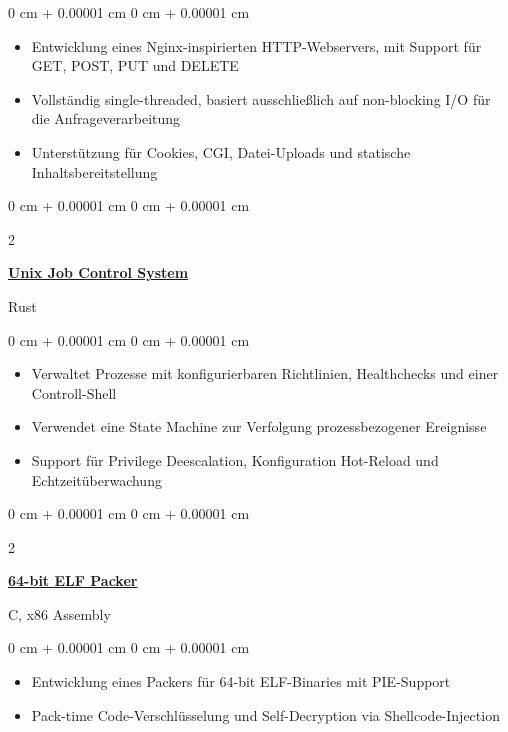 \documentclass[10pt, letterpaper]{article}
\newenvironment{highlights}{
    \begin{itemize}[
        topsep=0.10 cm,
        parsep=0.10 cm,
        partopsep=0pt,
        itemsep=0pt,
        leftmargin=0 cm + 10pt
    ]
}{
    \end{itemize}
}
\newenvironment{onecolentry}{
    \begin{adjustwidth}{
        0 cm + 0.00001 cm
    }{
        0 cm + 0.00001 cm
    }
}{
    \end{adjustwidth}
}
\newenvironment{twocolentry}[2][]{
    \onecolentry
    \def\secondColumn{#2}
    \setcolumnwidth{\fill, 4.5 cm}
    \begin{paracol}{2}
}{
    \switchcolumn \raggedleft \secondColumn
    \end{paracol}
    \endonecolentry
}
\begin{document}
    \vspace{0.10 cm}
    
    \begin{onecolentry}
        \begin{highlights}
            \item Entwicklung eines Nginx-inspirierten HTTP-Webservers, mit Support für GET, POST, PUT und DELETE
            \item Vollständig single-threaded, basiert ausschließlich auf non-blocking I/O für die Anfrageverarbeitung
            \item Unterstützung für Cookies, CGI, Datei-Uploads und statische Inhaltsbereitstellung
        \end{highlights}
    \end{onecolentry}

    \vspace{0.2 cm}

    \begin{twocolentry}
        {Rust}
        \href{https://github.com/winstonallo/taskmaster}{\textbf{Unix Job Control System}}
    \end{twocolentry}

    \vspace{0.10 cm}
    
    \begin{onecolentry}
        \begin{highlights}
            \item Verwaltet Prozesse mit konfigurierbaren Richtlinien, Healthchecks und einer Controll-Shell
            \item Verwendet eine State Machine zur Verfolgung prozessbezogener Ereignisse
            \item Support für Privilege Deescalation, Konfiguration Hot-Reload und Echtzeitüberwachung
        \end{highlights}
    \end{onecolentry}

    \vspace{0.2cm}

    \begin{twocolentry}
        {C, x86 Assembly}
        \href{https://github.com/winstonallo/woody-woodpacker}{\textbf{64-bit ELF Packer}}
    \end{twocolentry}

    \vspace{0.10 cm}

    \begin{onecolentry}
        \begin{highlights}
            \item Entwicklung eines Packers für 64-bit ELF-Binaries mit PIE-Support
            \item Pack-time Code-Verschlüsselung und Self-Decryption via Shellcode-Injection
        \end{highlights}
    \end{onecolentry}
\end{document}

